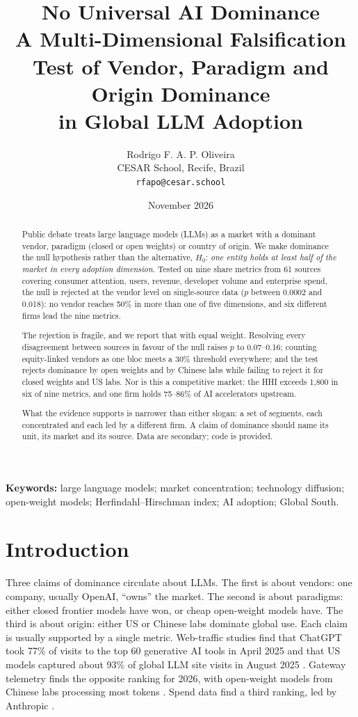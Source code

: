 \documentclass[11pt]{article}
\title{\textbf{No Universal AI Dominance}\\[4pt]
\large A Multi-Dimensional Falsification Test of Vendor, Paradigm and Origin Dominance\\ in Global LLM Adoption}
\author{Rodrigo F. A. P. Oliveira\\ \small CESAR School, Recife, Brazil\\ \small \texttt{rfapo@cesar.school}}
\date{November 2026}
\newcommand{\Hzero}{H_{0}}
\begin{document}
\maketitle

\begin{abstract}
\noindent Public debate treats large language models (LLMs) as a market with a dominant vendor, paradigm (closed or open weights) or country of origin. We make dominance the null hypothesis rather than the alternative, $\Hzero$: \emph{one entity holds at least half of the market in every adoption dimension}. Tested on nine share metrics from 61 sources covering consumer attention, users, revenue, developer volume and enterprise spend, the null is rejected at the vendor level on single-source data ($p$ between 0.0002 and 0.018): no vendor reaches 50\% in more than one of five dimensions, and six different firms lead the nine metrics.

The rejection is fragile, and we report that with equal weight. Resolving every disagreement between sources in favour of the null raises $p$ to 0.07--0.16; counting equity-linked vendors as one bloc meets a 30\% threshold everywhere; and the test rejects dominance by open weights and by Chinese labs while failing to reject it for closed weights and US labs. Nor is this a competitive market: the HHI exceeds 1{,}800 in six of nine metrics, and one firm holds 75--86\% of AI accelerators upstream.

What the evidence supports is narrower than either slogan: a set of segments, each concentrated and each led by a different firm. A claim of dominance should name its unit, its market and its source. Data are secondary; code is provided.
\end{abstract}

\noindent\textbf{Keywords:} large language models; market concentration; technology diffusion; open-weight models; Herfindahl--Hirschman index; AI adoption; Global South.

\section{Introduction}

Three claims of dominance circulate about LLMs. The first is about vendors: one company, usually OpenAI, ``owns'' the market. The second is about paradigms: either closed frontier models have won, or cheap open-weight models have. The third is about origin: either US or Chinese labs dominate global use. Each claim is usually supported by a single metric. Web-traffic studies find that ChatGPT took 77\% of visits to the top 60 generative AI tools in April 2025 \cite{liu2025who} and that US models captured about 93\% of global LLM site visits in August 2025 \cite{wang2026uschina}. Gateway telemetry finds the opposite ranking for 2026, with open-weight models from Chinese labs processing most tokens \cite{openrouter2026tokens,vercel2026index}. Spend data find a third ranking, led by Anthropic \cite{menlo2026state,ramp2026index}.
\end{document}
